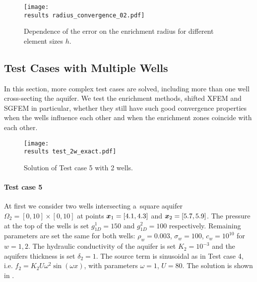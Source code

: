 \begin{figure}[!htb]
  \centering    
  \texttt{[image: \\results radius\_convergence\_02.pdf]}
  \caption[Optimal enrichment radius.]{Dependence of the error on the enrichment radius for different
  element sizes $h$.}
  \label{fig:radius_conv_2}
\end{figure}


\subsection{Test Cases with Multiple Wells}
\label{sec:2d_results_multiple}
In this section, more complex test cases are solved, including more than one well cross-secting the aquifer.
We test the enrichment methods, shifted XFEM and SGFEM in particular, whether they
still have such good convergence properties when the wells influence each other and when the enrichment zones coincide with each other.

%
\begin{figure}[!htb]
  \centering    
    \texttt{[image: \\results test\_2w\_exact.pdf]}
  \caption{Solution of Test case 5 with 2 wells. }
  \label{fig:test_2w_exact}
\end{figure}
\paragraph{Test case 5}
At first we consider two wells intersecting a~square aquifer $\Omega_2 = [0,10]\times[0, 10]$ at points $\mathbf{\boldsymbol{x}}_1 = [4.1, 4.3]$ and $\mathbf{\boldsymbol{x}}_2 = [5.7, 5.9]$.
The pressure at the top of the wells is set $g^1_{1D}=150$ and $g^2_{1D}=100$ respectively.
Remaining parameters are set the same for both wells: $\rho_w = 0.003$, $\sigma_w = 100$, $c_w = 10^{10}$ for $w=1,2$.
The hydraulic conductivity of the aquifer is set $K_2=10^{-3}$ and the aquifers thickness is set $\delta_2=1$.
The source term is sinusoidal as in Test case 4, i.e. $f_2 = K_2U\omega^2\sin(\omega x)$, with parameters $\omega=1$, $U=80$.
The solution is shown in .

